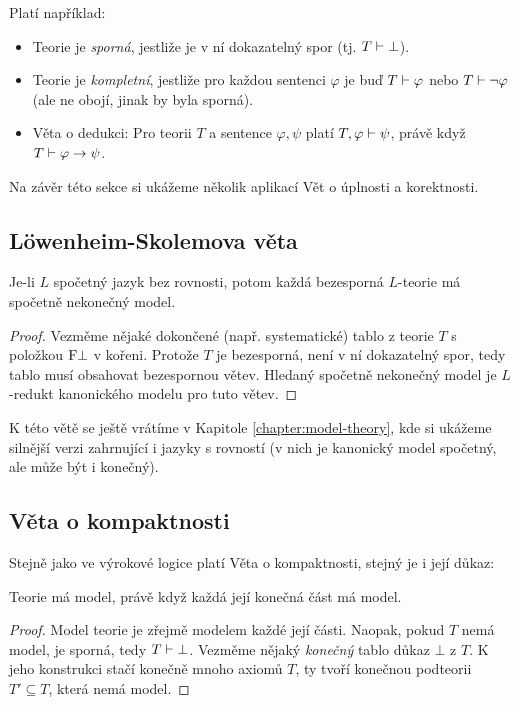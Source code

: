Platí například:
\begin{itemize}
    \item Teorie je \emph{sporná}, jestliže je v ní dokazatelný spor (tj. $T\vdash\bot$).
    \item Teorie je \emph{kompletní}, jestliže pro každou sentenci $\varphi$ je buď $T\vdash\varphi$ nebo $T\vdash\neg\varphi$ (ale ne obojí, jinak by byla sporná).
    \item Věta o dedukci: Pro teorii $T$ a sentence $\varphi,\psi$ platí $T,\varphi\vdash\psi$, právě když $T\vdash\varphi\to\psi$.
\end{itemize}

Na závěr této sekce si ukážeme několik aplikací Vět o úplnosti a korektnosti.

\subsection{Löwenheim-Skolemova věta}

\begin{theorem}
    Je-li $L$ spočetný jazyk bez rovnosti, potom každá bezesporná $L$-teorie má spočetně nekonečný model.
\end{theorem}

\begin{proof}
Vezměme nějaké dokončené (např. systematické) tablo z teorie $T$ s položkou $\mathrm{F}\bot$ v kořeni. Protože $T$ je bezesporná, není v ní dokazatelný spor, tedy tablo musí obsahovat bezespornou větev. Hledaný spočetně nekonečný model je $L$-redukt kanonického modelu pro tuto větev.
\end{proof}

K této větě se ještě vrátíme v Kapitole \ref{chapter:model-theory}, kde si ukážeme silnější verzi zahrnující i jazyky s rovností (v nich je kanonický model spočetný, ale může být i konečný).

\subsection{Věta o kompaktnosti}

Stejně jako ve výrokové logice platí Věta o kompaktnosti, stejný je i její důkaz:

\begin{theorem}[O kompaktnosti]\label{theorem:compactness-theorem-predicate}
    Teorie má model, právě když každá její konečná část má model.    
\end{theorem}
\begin{proof}
Model teorie je zřejmě modelem každé její části. Naopak, pokud $T$ nemá model, je sporná, tedy $T\vdash\bot$. Vezměme nějaký \emph{konečný} tablo důkaz $\bot$ z $T$. K jeho konstrukci stačí konečně mnoho axiomů $T$, ty tvoří konečnou podteorii $T'\subseteq T$, která nemá model.
\end{proof}


